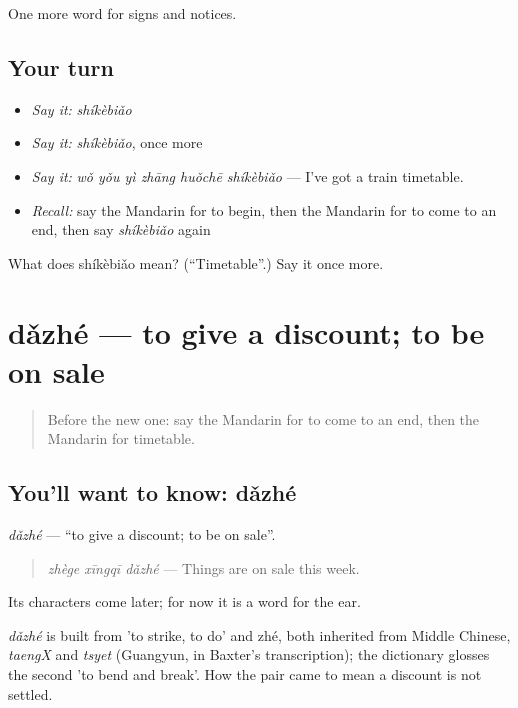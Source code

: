 \begin{grammarlens}[title={What you've built}]
One more word for signs and notices.
\end{grammarlens}

\subsection*{Your turn}
\begin{itemize}
\raggedright
  \item \emph{Say it:} \emph{shíkèbiǎo}
  \item \emph{Say it:} \emph{shíkèbiǎo}, once more
  \item \emph{Say it:} \emph{wǒ yǒu yì zhāng huǒchē shíkèbiǎo} — I've got a train timetable.
  \item \emph{Recall:} say the Mandarin for to begin, then the Mandarin for to come to an end, then say \emph{shíkèbiǎo} again
\end{itemize}

\begin{tcolorbox}[breakable,colback=teal!4,colframe=teal!35!black,title={Before you move on}]
What does shíkèbiǎo mean? (\textquotedblleft{}Timetable\textquotedblright{}.) Say it once more.
\end{tcolorbox}
\section[dǎzhé]{dǎzhé — to give a discount; to be on sale}

\label{lesson:ZH-C122-dazhe}



\begin{quote}
Before the new one: say the Mandarin for to come to an end, then the Mandarin for timetable.
\end{quote}

\subsection*{You'll want to know: dǎzhé}
\emph{dǎzhé} — \textquotedblleft{}to give a discount; to be on sale\textquotedblright{}.

\begin{quote}
\emph{zhège xīngqī dǎzhé} — Things are on sale this week.
\end{quote}

Its characters come later; for now it is a word for the ear.

\begin{cousinweb}
\emph{dǎzhé} is built from  'to strike, to do' and zhé, both inherited from Middle Chinese, \emph{taengX} and \emph{tsyet} (Guangyun, in Baxter's transcription); the dictionary glosses the second 'to bend and break'. How the pair came to mean a discount is not settled.
\end{cousinweb}

